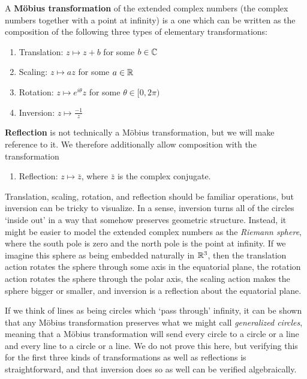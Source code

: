 \begin{definition}
A \textbf{M\"obius transformation} of the extended complex numbers (the complex numbers together with a point at infinity) is a one which can be written as the composition of the following three types of elementary transformations:


\begin{enumerate}
	\item[] Translation: $z\mapsto z+b$ for some $b\in \mathbb{C}$
	\item[] Scaling: $z\mapsto az$ for some $a\in \mathbb{R}$
	\item[] Rotation: $z\mapsto e^{i\theta}z$ for some $\theta\in [0,2\pi)$
	\item[] Inversion: $z \mapsto \tfrac{-1}{z}$
	
\end{enumerate}


\textbf{Reflection} is not technically a M\"obius transformation, but we will make reference to it.  We therefore additionally allow composition with the transformation
\begin{enumerate}
	\item[] Reflection: $z\mapsto \bar{z}$, where $\bar{z}$ is the complex conjugate.
\end{enumerate}


\end{definition}


Translation, scaling, rotation, and reflection should be familiar operations, but inversion can be tricky to visualize.  In a sense, inversion turns all of the circles `inside out' in a way that somehow preserves geometric structure.  Instead, it might be easier to model the extended complex numbers as the \textit{Riemann sphere}, where the south pole is zero and the north pole is the point at infinity.  If we imagine this sphere as being embedded naturally in $\mathbb{R}^3$, then the translation action rotates the sphere through some axis in the equatorial plane, the rotation action rotates the sphere through the polar axis, the scaling action makes the sphere bigger or smaller, and inversion is a reflection about the equatorial plane. 


If we think of lines as being circles which `pass through' infinity, it can be shown that any M\"obius transformation preserves what we might call \textit{generalized circles}, meaning that a M\"obius transformation will send every circle to a circle or a line and every line to a circle or a line.  We do not prove this here, but verifying this for the first three kinds of transformations as well as reflections is straightforward, and that inversion does so as well can be verified algebraically. 

